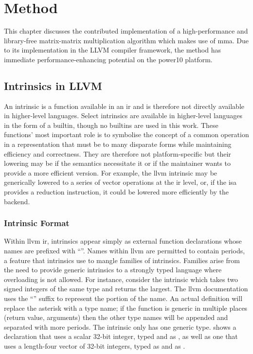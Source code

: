 \documentclass[\main/thesis.tex]{subfiles}
\begin{document}
\chapter{Method}
\label{cha:method}
This chapter discusses the contributed implementation of a high-performance and library-free matrix-matrix multiplication algorithm which makes use of \gls{mma}.
Due to its implementation in the LLVM compiler framework, the method has immediate performance-enhancing potential on the \gls{power10} platform.

\section{Intrinsics in LLVM}
An \gls{intrinsic} is a function available in an \gls{ir} and is therefore not directly available in higher-level languages.
Select \glspl{intrinsic} are available in higher-level languages in the form of a \gls{builtin}, though no \glspl{builtin} are used in this work.\footnotemark
{}
These functions' most important role is to symbolise the concept of a common operation in a representation that must be  to many disparate forms while maintaining efficiency and correctness.
They are therefore not platform-specific but their lowering may be if the semantics necessitate it or if the maintainer wants to provide a more efficient version.
For example, the \gls{llvm} \gls{intrinsic}  may be generically lowered to a series of vector operations at the \gls{ir} level, or, if the \gls{isa} provides a reduction instruction, it could be lowered more efficiently by the backend.

\subsection{Intrinsic Format}
Within \gls{llvm} \gls{ir}, \glspl{intrinsic} appear simply as external function declarations whose names are prefixed with ``''.
Names within \gls{llvm} are permitted to contain periods, a feature that \glspl{intrinsic} use to \gls{mangle} families of \glspl{intrinsic}.
Families arise from the need to provide generic \glspl{intrinsic} to a strongly typed language where overloading is not allowed.
For instance, consider the  \gls{intrinsic} which takes two signed integers of the same type and returns the largest.
The \gls{llvm} documentation uses the ``'' suffix to represent the  portion of the name.
An actual definition will replace the asterisk with a type name; if the function is generic in multiple places (return value, arguments) then the other type names will be appended and separated with more periods.
The  \gls{intrinsic} only has one generic type.
 shows a declaration that uses a scalar 32-bit integer, typed and  as , as well as one that uses a length-four vector of 32-bit integers, typed as  and  as .
\end{document}
